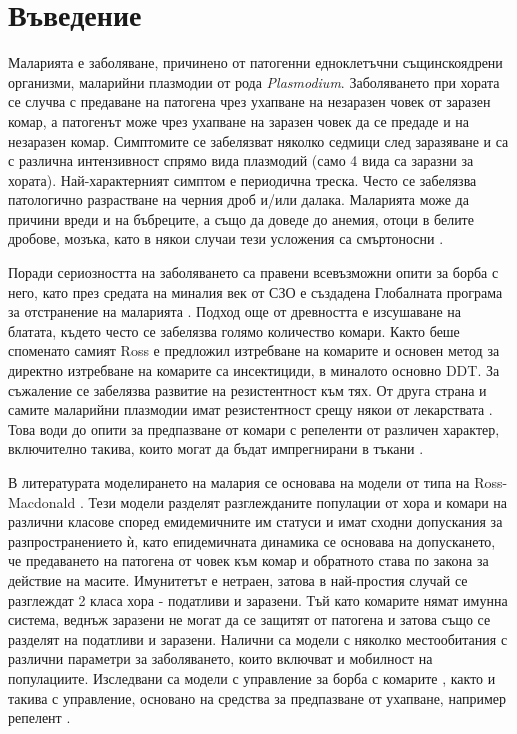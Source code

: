 \section{\hspace{1em} Въведение}
Маларията е заболяване, причинено от патогенни едноклетъчни същинскоядрени организми, маларийни плазмодии от рода \textit{Plasmodium}.
Заболяването при хората се случва с предаване на патогена чрез ухапване на незаразен човек от заразен комар, а патогенът може чрез ухапване на заразен човек да се предаде и на незаразен комар.
Симптомите се забелязват няколко седмици след заразяване и са с различна интензивност спрямо вида плазмодий (само 4 вида са заразни за хората).
Най-характерният симптом е периодична треска. Често се забелязва патологично разрастване на черния дроб и/или далака.
Маларията може да причини вреди и на бъбреците, а също да доведе до анемия, отоци в белите дробове, мозъка, като в някои случаи тези усложения са смъртоносни \cite[глава~83]{Baron1996}.


Поради сериозността на заболяването са правени всевъзможни опити за борба с него, като през средата на миналия век от СЗО е създадена Глобалната програма за отстранение на маларията \cite{WHO2017}.
Подход още от древността е изсушаване на блатата, където често се забелязва голямо количество комари.
Както беше споменато самият Ross е предложил изтребване на комарите и основен метод за директно изтребване на комарите са инсектициди, в миналото основно DDT.
За съжаление се забелязва развитие на резистентност към тях.
От друга страна и самите маларийни плазмодии имат резистентност срещу някои от лекарствата \cite[глава~83]{Baron1996}.
Това води до опити за предпазване от комари с репеленти от различен характер, включително такива, които могат да бъдат импрегнирани в тъкани \cite{Grancaric2019}.

В литературата моделирането на малария се основава на модели от типа на Ross-Macdonald \cite{Smith2012}.
Тези модели разделят разглежданите популации от хора и комари на различни класове според емидемичните им статуси и имат сходни допускания за разпространението ѝ, като епидемичната динамика се основава на допускането, че предаването на патогена от човек към комар и обратното става по закона за действие на масите.
Имунитетът е нетраен, затова в най-простия случай се разглеждат 2 класа хора - податливи и заразени.
Тъй като комарите нямат имунна система, веднъж заразени не могат да се защитят от патогена и затова също се разделят на податливи и заразени.
Налични са модели \cite{Cosner2009, Ruktanonchai2016, Bichara2016, Agusto2021, Prosper2012} с няколко местообитания с различни параметри за заболяването, които включват и мобилност на популациите.
Изследвани са модели с управление за борба с комарите \cite{DeLara2016}, както и такива с управление, основано на средства за предпазване от ухапване, например репелент \cite{Rashkov2022, Rashkov2021}.

